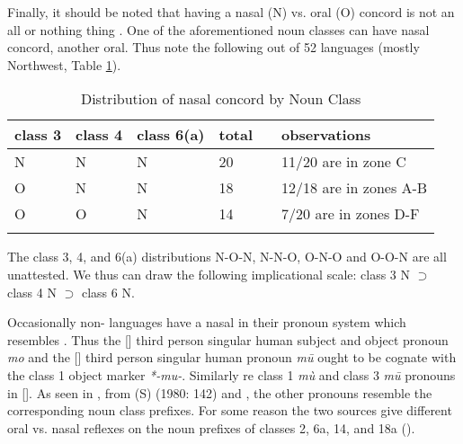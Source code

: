 \documentclass[output=paper]{langsci/langscibook}
\begin{document}
Finally, it should be noted that having a nasal (N) vs. oral (O) concord is not an all or nothing thing \citep[194-5]{Hyman1980nasalclasses}. One of the aforementioned noun classes can have nasal concord, another oral. Thus note the following out of 52  languages (mostly Northwest, Table \ref{tab:nasal:10}).

\begin{table}
\begin{tabularx}{\textwidth}{llllXl}
\lsptoprule
class 3 &class 4 &class 6(a) &total &  &observations\\
\midrule
 N & N & N & 20 &  & 11/20 are in zone C\\
 O & N & N & 18 &  & 12/18 are in zones A-B\\
 O & O & N & 14 &  & 7/20 are in zones D-F \\
\lspbottomrule
\end{tabularx}
\caption{Distribution of nasal concord by Noun Class}
\label{tab:nasal:10}
\end{table}

The class 3, 4, and 6(a) distributions N-O-N, N-N-O, O-N-O and O-O-N are all unattested. We thus can draw the following implicational scale: class 3 N ${\supset}$ class 4 N ${\supset}$ class 6 N. 

Occasionally non- languages have a nasal in their pronoun system which resembles . Thus the  [] third person singular human subject and object pronoun \textit{mo} \citep{Arnott1970} and the  [] third person singular human pronoun \textit{mū} \citep[169]{Martin2012} ought to be cognate with the  class 1 object marker \textit{*-mu-}. Similarly re class 1 \textit{mù} and class 3 \textit{mū} pronouns in  []. As seen in , from \citeauthor{Stallcup1980esimbi} (S) (1980: 142) and \citet[8--9, 27]{KoenigEtAl2013}, the other pronouns resemble the corresponding noun class prefixes. For some reason the two sources give different oral vs. nasal reflexes on the noun prefixes of classes 2, 6a, 14, and 18a ().
\end{document}
